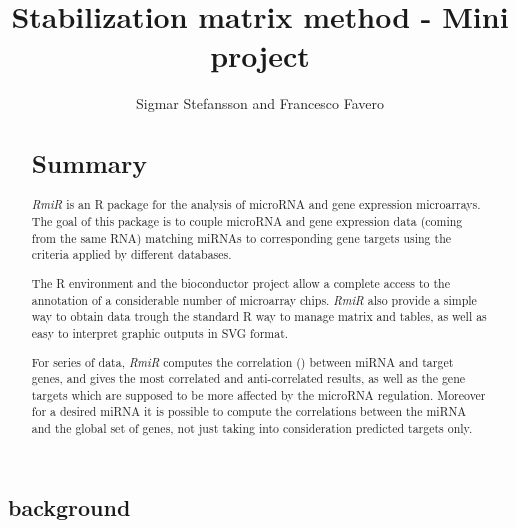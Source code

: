 \documentclass{bioinfo}
\begin{document}
\begin{application}

\title[SMM Project]{Stabilization matrix method - Mini project}
\author[Sigmar Stefansson, Francesco Favero]{Sigmar Stefansson and Francesco Favero}
\address{Danmarks Tekniske Univeristet}



\maketitle

\begin{abstract}

\section{Summary}
\textit{RmiR} is an R package for the analysis of microRNA and gene expression microarrays. The goal of this package is to couple microRNA and gene expression data (coming from the same RNA) matching miRNAs to corresponding gene targets using the criteria applied by different databases.
\par The R environment and the bioconductor project allow a complete access to the annotation of a considerable number of microarray chips. \textit{RmiR} also provide a simple way to obtain data trough the standard R way to manage matrix and tables, as well as easy to interpret graphic outputs in SVG format.
\par For series of data, \textit{RmiR} computes the correlation (\cite{ambs2008}) between miRNA and target genes, and gives the most correlated and anti-correlated results, as well as the gene targets which are supposed to be more affected by the microRNA regulation. Moreover for a desired miRNA it is possible to compute the correlations between the miRNA and the global set of genes, not just taking into consideration predicted targets only.

\end{abstract}

\section*{background}


\end{application}
\end{document}

